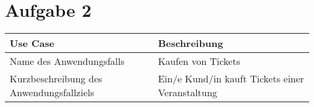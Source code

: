 \chapter*{Aufgabe 2}

\begin{tabular}{p{} p{}} 
	\hline
	Use Case & Beschreibung \\ 
	\hline
	Name des Anwendungsfalls & Kaufen von Tickets \\
	\hline
	Kurzbeschreibung des Anwendungsfallziels & Ein/e Kund/in kauft Tickets einer Veranstaltung \\
	\hline 
\end{tabular} 